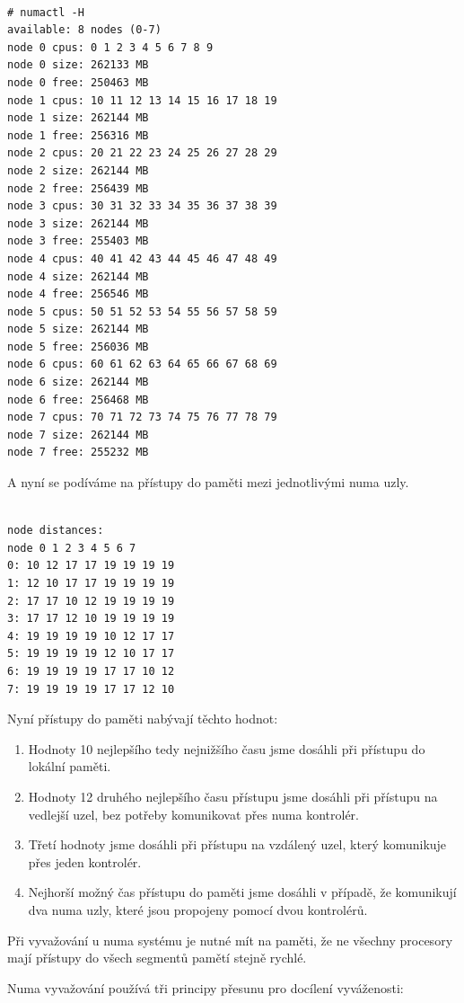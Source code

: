 \documentclass[a4paper,12pt]{article}
\begin{document}
\begin{verbatim}

# numactl -H
available: 8 nodes (0-7)
node 0 cpus: 0 1 2 3 4 5 6 7 8 9
node 0 size: 262133 MB
node 0 free: 250463 MB
node 1 cpus: 10 11 12 13 14 15 16 17 18 19
node 1 size: 262144 MB
node 1 free: 256316 MB
node 2 cpus: 20 21 22 23 24 25 26 27 28 29
node 2 size: 262144 MB
node 2 free: 256439 MB
node 3 cpus: 30 31 32 33 34 35 36 37 38 39
node 3 size: 262144 MB
node 3 free: 255403 MB
node 4 cpus: 40 41 42 43 44 45 46 47 48 49
node 4 size: 262144 MB
node 4 free: 256546 MB
node 5 cpus: 50 51 52 53 54 55 56 57 58 59
node 5 size: 262144 MB
node 5 free: 256036 MB
node 6 cpus: 60 61 62 63 64 65 66 67 68 69
node 6 size: 262144 MB
node 6 free: 256468 MB
node 7 cpus: 70 71 72 73 74 75 76 77 78 79
node 7 size: 262144 MB
node 7 free: 255232 MB

\end{verbatim}

\newpage
\noindent
A nyní se podíváme na přístupy do paměti mezi jednotlivými numa uzly. 
\begin{verbatim}

node distances:
node 0 1 2 3 4 5 6 7
0: 10 12 17 17 19 19 19 19
1: 12 10 17 17 19 19 19 19
2: 17 17 10 12 19 19 19 19
3: 17 17 12 10 19 19 19 19
4: 19 19 19 19 10 12 17 17
5: 19 19 19 19 12 10 17 17
6: 19 19 19 19 17 17 10 12
7: 19 19 19 19 17 17 12 10

\end{verbatim}
\noindent
Nyní přístupy do paměti nabývají těchto hodnot:
\begin{enumerate}
\item Hodnoty 10 nejlepšího tedy nejnižšího času jsme dosáhli při přístupu do lokální paměti.
\item Hodnoty 12 druhého nejlepšího času přístupu jsme dosáhli při přístupu na vedlejší uzel, bez potřeby komunikovat přes numa kontrolér. 
\item Třetí hodnoty jsme dosáhli při přístupu na vzdálený uzel, který komunikuje přes jeden kontrolér.
\item Nejhorší možný čas přístupu do paměti jsme dosáhli v případě, že komunikují dva numa uzly, které jsou propojeny pomocí dvou kontrolérů.
\end{enumerate}

Při vyvažování u numa systému je nutné mít na paměti, že ne všechny procesory mají přístupy do všech segmentů pamětí stejně rychlé.

\noindent
Numa vyvažování používá tři principy přesunu pro docílení vyváženosti:
\end{document}
